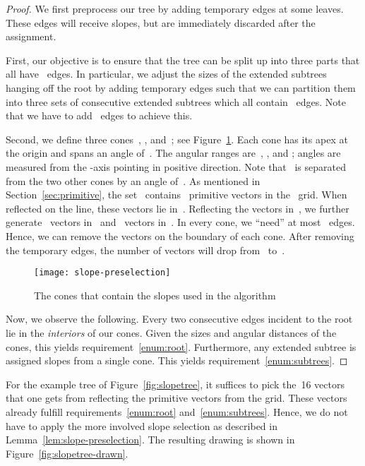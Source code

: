 \documentclass[a4paper,11pt]{article}
\theoremstyle{plain}
\begin{document}
\begin{proof}
	We first preprocess our tree by adding temporary edges at some
	leaves. These edges will receive slopes, but are immediately discarded
	after the assignment.

	First, our objective is to ensure that the tree can be split up into three 
	parts that all have~ edges. In particular, we adjust the sizes of the 
	extended subtrees hanging off the root by adding temporary edges such that we 
	can partition them into three sets of consecutive extended subtrees which all 
	contain~ edges.  Note that we have to add~ edges to achieve this.

	Second, we define three cones~, , and~; see 
	Figure~\ref{fig:slope-preselection}.  Each cone
	has its apex at the origin and spans an angle of~.  The angular
	ranges are~, , and ; 
	angles are measured from the -axis pointing
	in positive direction.  Note that~ is separated from the two
	other cones by an angle of~.  As mentioned in
	Section~\ref{sec:primitive}, the set~ contains~ primitive
	vectors in the~ grid. 
	When reflected on the  line, these vectors lie in~. 
	Reflecting the vectors in~, we further generate~ vectors
	in~ and~ vectors in~.  In every cone, we ``need'' at most~ 
	edges. Hence, we can remove the vectors on the boundary of each cone.
	After removing the temporary edges, the number of vectors will drop from~ 
	to~. 

	\begin{figure}[t]
		\centering
		\texttt{[image: slope-preselection]}
		\caption{The cones that contain the slopes used in the algorithm}  
		\label{fig:slope-preselection}
	\end{figure}

	Now, we observe the following.  Every two consecutive edges incident to
	the root lie in the \emph{interiors} of our cones.  Given the sizes and angular 
	distances of the cones, this yields requirement~\ref{enum:root}.  
	Furthermore, any extended subtree is assigned slopes
	from a single cone.  This yields requirement~\ref{enum:subtrees}.
\end{proof}

For the example tree of Figure~\ref{fig:slopetree}, it suffices to pick
the~16 vectors that one gets from reflecting the primitive vectors
from the  grid.  These vectors already fulfill
requirements~\ref{enum:root} and~\ref{enum:subtrees}.  Hence, we
do not have to apply the more involved slope selection as described
in Lemma~\ref{lem:slope-preselection}.  The resulting drawing is shown
in Figure~\ref{fig:slopetree-drawn}.
\end{document}

